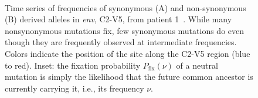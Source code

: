 \documentclass[rmp, twocolumn]{revtex4}
\newcommand{\env}{\textit{env}}
\begin{document}
\begin{figure}
\begin{center}
\\
\caption{Time series of frequencies of synonymous (A) and non-synonymous (B)
derived alleles in \env, C2-V5, from patient
1~\cite{shankarappa_consistent_1999}.
While many nonsynonymous mutations  fix, few synonymous
mutations do even though they are frequently observed at intermediate
frequencies. Colors indicate the position of the site along the C2-V5 region
(blue to red). Inset: the fixation probability $P_\text{fix}(\nu)$ of a neutral mutation
is simply the likelihood that the future common ancestor is currently carrying
it, i.e., its frequency $\nu$.}
\label{fig:aft}
\end{center}
\end{figure}
\end{document}
